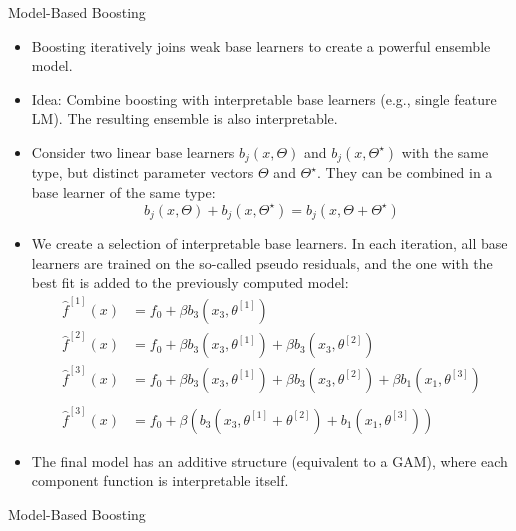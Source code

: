 \documentclass[11pt,compress,t,notes=noshow, xcolor=table]{beamer}
\begin{document}
\begin{vbframe}{Model-Based Boosting}

\begin{itemize}
\setlength\itemsep{2em}
\item 
Boosting iteratively joins weak base learners to create a powerful ensemble model.
\item 
Idea: Combine boosting with interpretable base learners (e.g., single feature LM). The resulting ensemble is also interpretable.
\item
Consider two linear base learners $b_j(x, \Theta)$ and $b_j(x, \Theta^{\star})$ with the same type, but distinct parameter vectors $\Theta$ and $\Theta^{\star}$. They can be combined in a base learner of the same type:
$$
b_j(x, \Theta) + b_j(x, \Theta^{\star}) = b_j(x, \Theta + \Theta^{\star})
$$
\item We create a selection of interpretable base learners. In each iteration, all base learners are trained on the so-called pseudo residuals, and the one with the best fit is added to the previously computed model:
\begin{align*}
\widehat{f}^{[1]}(x) &= f_0 + \beta b_3(x_3, \theta^{[1]}) \\
\widehat{f}^{[2]}(x) &= f_0 + \beta b_3(x_3, \theta^{[1]}) + \beta b_3(x_3, \theta^{[2]})\\
\widehat{f}^{[3]}(x) &= f_0 + \beta b_3(x_3, \theta^{[1]}) + \beta b_3(x_3, \theta^{[2]}) + \beta b_1(x_1, \theta^{[3]}) \\
\\
\widehat{f}^{[3]}(x) &= f_0 + \beta \left(b_3(x_3, \theta^{[1]} + \theta^{[2]}) + b_1(x_1, \theta^{[3]})\right)
\end{align*}

\item The final model has an additive structure (equivalent to a GAM), where each component function is interpretable itself.

\end{itemize}
\end{vbframe}

\begin{vbframe}{Model-Based Boosting}
\tiny

\end{vbframe}
\end{document}
